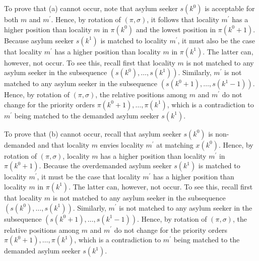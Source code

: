 \documentclass[12pt,fleqn]{article}
\begin{document}
To prove that (a) cannot occur, note that asylum seeker $s(k^0)$ is acceptable for both $m$ and $m^\prime$. Hence, by rotation of $(\pi,\sigma)$, it follows that locality $m^\prime$ has a higher position than locality $m$ in $\pi(k^0)$ and the lowest position in $\pi(k^0+1)$. Because asylum seeker $s(k^1)$ is matched to locality $m^\prime$, it must also be the case that locality $m^\prime$ has a higher position than locality $m$ in $\pi(k^1)$. The latter can, however, not occur. To see this, recall first that locality $m$ is not matched to any asylum seeker in the subsequence $(s(k^0),\ldots,s(k^1))$.
Similarly, $m^\prime$ is not matched to any asylum seeker in the subsequence $(s(k^0+1),\ldots,s(k^1-1))$. Hence, by rotation of $(\pi,\sigma)$, the relative positions among $m$ and $m^\prime$ do not change for the priority orders $\pi(k^0+1),\ldots,\pi(k^1)$, which is a contradiction to $m^\prime$ being matched to the demanded asylum seeker $s(k^1)$.

To prove that (b) cannot occur, recall that asylum seeker $s(k^0)$ is non-demanded and that locality $m$ envies locality $m^\prime$ at matching $x(k^0)$. Hence, by rotation of $(\pi,\sigma)$, locality $m$ has a higher position than locality $m^\prime$ in $\pi(k^0+1)$. Because the overdemanded asylum seeker $s(k^1)$ is matched to locality $m^\prime$, it must be the case that locality $m^\prime$ has a higher position than locality $m$ in $\pi(k^1)$.
The latter can, however, not occur. To see this, recall first that locality $m$ is not matched to any asylum seeker in the subsequence $(s(k^0),\ldots,s(k^1))$. Similarly, $m^\prime$ is not matched to any asylum seeker in the subsequence $(s(k^0+1),\ldots,s(k^1-1))$. Hence, by rotation of $(\pi,\sigma)$, the relative positions among $m$ and $m^\prime$ do not change for the priority orders $\pi(k^0+1),\ldots,\pi(k^1)$, which is a contradiction to $m^\prime$ being matched to the demanded asylum seeker $s(k^1)$.
\end{document}
